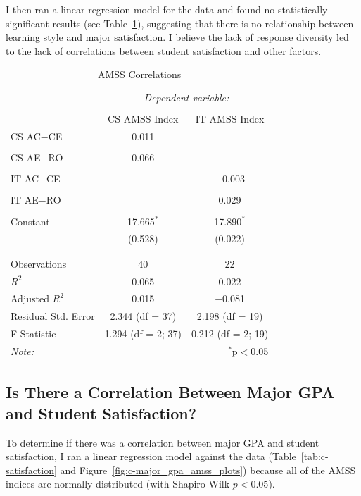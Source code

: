 I then ran a linear regression model for the data and found no statistically significant results (see Table~\ref{tab:c-amss_corr}), suggesting that there is no relationship between learning style and major satisfaction. I believe the lack of response diversity led to the lack of correlations between student satisfaction and other factors.

\begin{table}[!htbp]
  \centering
  \vspace{0.5in}
  \caption{AMSS Correlations}
  \label{tab:c-amss_corr}
  \begin{tabular}{@{\extracolsep{5pt}}lcc}
    \toprule
    & \multicolumn{2}{c}{\textit{Dependent variable:}} \\
    \cline{2-3}
    \\[-1.8ex] & CS AMSS Index & IT AMSS Index \\
    \midrule
    CS AC$-$CE & 0.011 &  \\
    & & \\
    CS AE$-$RO & 0.066 &  \\
    & & \\
    IT AC$-$CE &  & $-$0.003 \\
    & & \\
    IT AE$-$RO &  & 0.029 \\
    & & \\
    Constant & 17.665$^{*}$ & 17.890$^{*}$ \\
    & (0.528) & (0.022) \\
    & & \\
    \hline \\[-1.8ex]
    Observations & 40 & 22 \\
    $R^{2}$ & 0.065 & 0.022 \\
    Adjusted $R^{2}$ & 0.015 & $-$0.081 \\
    Residual Std. Error & 2.344 (df = 37) & 2.198 (df = 19) \\
    F Statistic & 1.294 (df = 2; 37) & 0.212 (df = 2; 19) \\
    \bottomrule
    \textit{Note:}  & \multicolumn{2}{r}{$^{*}$p$<$0.05} \\
  \end{tabular}
  \vspace{0.5in}
\end{table}

\subsection{Is There a Correlation Between Major GPA and Student Satisfaction?}
To determine if there was a correlation between major GPA and student satisfaction, I ran a linear regression model against the data (Table~\ref{tab:c-satisfaction} and Figure~\ref{fig:c-major_gpa_amss_plots}) because all of the AMSS indices are normally distributed (with Shapiro-Wilk $p<0.05$).

